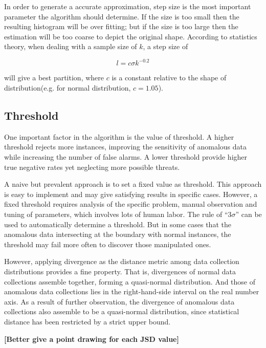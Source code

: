 \documentclass[a4paper]{IEEEtran}
\begin{document}
			In order to generate a accurate approximation, step size is the most important parameter the algorithm should determine. If the size is too small then the resulting histogram will be over fitting; but if the size is too large then the estimation will be too coarse to depict the original shape. According to statistics theory, when dealing with a sample size of $k$, a step size of 
			
			\begin{equation}\label{equ:step-size}
				l = c \sigma k^{-0.2}
			\end{equation}
			
			will give a best partition, where $c$ is a constant relative to the shape of distribution(e.g. for normal distribution, $c=1.05$).
			
		\subsection{Threshold}\label{sec:alg-threshold}
			One important factor in the algorithm is the value of threshold. A higher threshold rejects more instances, improving the sensitivity of anomalous data while increasing the number of false alarms. A lower threshold provide higher true negative rates yet neglecting more possible threats.
			
			A naive but prevalent approach is to set a fixed value as threshold. This approach is easy to implement and may give satisfying results in specific cases. However, a fixed threshold requires analysis of the specific problem, manual observation and tuning of parameters, which involves lots of human labor. The rule of ``$3 \sigma$'' can be used to automatically determine a threshold. But in some cases that the anomalous data intersecting at the boundary with normal instances, the threshold may fail more often to discover those manipulated ones.
			
			However, applying divergence as the distance metric among data collection distributions provides a fine property. That is, divergences of normal data collections assemble together, forming a quasi-normal distribution. And those of anomalous data collections lies in the right-hand-side interval on the real number axis. As a result of further observation, the divergence of anomalous data collections also assemble to be a quasi-normal distribution, since statistical distance has been restricted by a strict upper bound.
			
			\textbf{[Better give a point drawing for each JSD value]}
			
\end{document}
